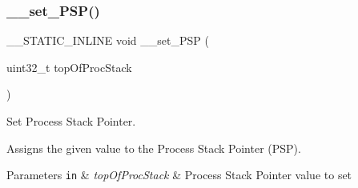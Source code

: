 \subsubsection{\texorpdfstring{\+\_\+\+\_\+set\+\_\+\+P\+S\+P()}{\_\_set\_PSP()}}
{\footnotesize\ttfamily \+\_\+\+\_\+\+S\+T\+A\+T\+I\+C\+\_\+\+I\+N\+L\+I\+NE void \+\_\+\+\_\+set\+\_\+\+P\+SP (\begin{DoxyParamCaption}\item[{uint32\+\_\+t}]{top\+Of\+Proc\+Stack }\end{DoxyParamCaption})}



Set Process Stack Pointer. 

Assigns the given value to the Process Stack Pointer (P\+SP). 
\begin{DoxyParams}[1]{Parameters}
\mbox{\tt in}  & {\em top\+Of\+Proc\+Stack} & Process Stack Pointer value to set \\
\hline
\end{DoxyParams}
